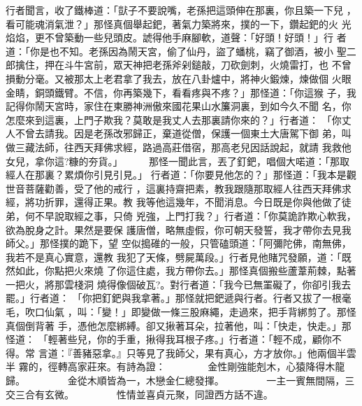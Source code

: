 \begin{pinyinscope}
{行者聞言，收了鐵棒道：「獃子不要說嘴，老孫把這頭伸在那裏，你且築一下兒
，看可能魂消氣泄？」那怪真個舉起鈀，著氣力築將來，撲的一下，鑽起鈀的火
光焰焰，更不曾築動一些兒頭皮。諕得他手麻腳軟，道聲：「好頭！好頭！」行
者道：「你是也不知。老孫因為鬧天宮，偷了仙丹，盜了蟠桃，竊了御酒，被小
聖二郎擒住，押在斗牛宮前，眾天神把老孫斧剁鎚敲，刀砍劍刺，火燒雷打，也
不曾損動分毫。又被那太上老君拿了我去，放在八卦爐中，將神火鍛煉，煉做個
火眼金睛，銅頭鐵臂。不信，你再築幾下，看看疼與不疼？」那怪道：「你這猴
子，我記得你鬧天宮時，家住在東勝神洲傲來國花果山水簾洞裏，到如今久不聞
名，你怎麼來到這裏，上門子欺我？莫敢是我丈人去那裏請你來的？」行者道：
「你丈人不曾去請我。因是老孫改邪歸正，棄道從僧，保護一個東土大唐駕下御
弟，叫做三藏法師，往西天拜佛求經，路過高莊借宿，那高老兒因話說起，就請
我救他女兒，拿你這?糠的夯貨。」
　　
那怪一聞此言，丟了釘鈀，唱個大喏道：「那取經人在那裏？累煩你引見引見。」
行者道：「你要見他怎的？」那怪道：「我本是觀世音菩薩勸善，受了他的戒行
，這裏持齋把素，教我跟隨那取經人往西天拜佛求經，將功折罪，還得正果。教
我等他這幾年，不聞消息。今日既是你與他做了徒弟，何不早說取經之事，只倚
兇強，上門打我？」行者道：「你莫詭詐欺心軟我，欲為脫身之計。果然是要保
護唐僧，略無虛假，你可朝天發誓，我才帶你去見我師父。」那怪撲的跪下，望
空似搗碓的一般，只管磕頭道：「阿彌陀佛，南無佛，我若不是真心實意，還教
我犯了天條，劈屍萬段。」行者見他賭咒發願，道：「既然如此，你點把火來燒
了你這住處，我方帶你去。」那怪真個搬些蘆葦荊棘，點著一把火，將那雲棧洞
燒得像個破瓦?。對行者道：「我今已無罣礙了，你卻引我去罷。」行者道：
「你把釘鈀與我拿著。」那怪就把鈀遞與行者。行者又拔了一根毫毛，吹口仙氣
，叫：「變！」即變做一條三股麻繩，走過來，把手背綁剪了。那怪真個倒背著
手，憑他怎麼綁縛。卻又揪著耳朵，拉著他，叫：「快走，快走。」那怪道：
「輕著些兒，你的手重，揪得我耳根子疼。」行者道：「輕不成，顧你不得。常
言道：『善豬惡拿。』只等見了我師父，果有真心，方才放你。」他兩個半雲半
霧的，徑轉高家莊來。有詩為證：
　　　　金性剛強能剋木，心猿降得木龍歸。
　　　　金從木順皆為一，木戀金仁總發揮。
　　　　一主一賓無間隔，三交三合有玄微。
　　　　性情並喜貞元聚，同證西方話不違。

}
\end{pinyinscope}
